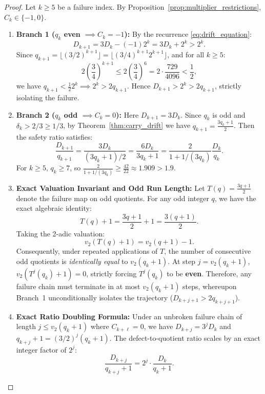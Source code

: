\documentclass[11pt,reqno]{amsart}
\theoremstyle{definition}
\numberwithin{equation}{section}
\begin{document}
\begin{proof}
Let $k \ge 5$ be a failure index. By Proposition~\ref{prop:multiplier_restrictions}, $C_k \in \{-1, 0\}$.
\begin{enumerate}
    \item \textbf{Branch 1 ($q_k$ even $\implies C_k = -1$):}
    By the recurrence \eqref{eq:drift_equation}:
    \[
    D_{k+1} = 3 D_k - (-1) 2^k = 3 D_k + 2^k > 2^k.
    \]
    Since $q_{k+1} = \lfloor (3/2)^{k+1} \rfloor = \lfloor (3/4)^{k+1} 2^{k+1} \rfloor$, and for all $k \ge 5$:
    \[
    2 \left(\frac{3}{4}\right)^{k+1} \le 2 \left(\frac{3}{4}\right)^6 = 2 \cdot \frac{729}{4096} < \frac{1}{2},
    \]
    we have $q_{k+1} < \frac{1}{2} 2^k \implies 2^k > 2 q_{k+1}$.
    Hence $D_{k+1} > 2^k > 2 q_{k+1}$, strictly isolating the failure.
    \item \textbf{Branch 2 ($q_k$ odd $\implies C_k = 0$):}
    Here $D_{k+1} = 3 D_k$. Since $q_k$ is odd and $\delta_k > 2/3 \ge 1/3$, by Theorem~\ref{thm:carry_drift} we have $q_{k+1} = \frac{3 q_k + 1}{2}$.
    Then the safety ratio satisfies:
    \[
    \frac{D_{k+1}}{q_{k+1}} = \frac{3 D_k}{(3 q_k + 1)/2} = \frac{6 D_k}{3 q_k + 1} = \frac{2}{1 + 1/(3q_k)} \frac{D_k}{q_k}.
    \]
    For $k \ge 5$, $q_k \ge 7$, so $\frac{2}{1 + 1/(3q_k)} \ge \frac{42}{22} \approx 1.909 > 1.9$.
    \item \textbf{Exact Valuation Invariant and Odd Run Length:}
    Let $T(q) = \frac{3q+1}{2}$ denote the failure map on odd quotients. For any odd integer $q$, we have the exact algebraic identity:
    \begin{equation}\label{eq:collatz_invariant}
    T(q) + 1 = \frac{3q+1}{2} + 1 = \frac{3(q+1)}{2}.
    \end{equation}
    Taking the 2-adic valuation:
    \begin{equation}\label{eq:v2_collatz_drop}
    v_2(T(q) + 1) = v_2(q + 1) - 1.
    \end{equation}
    Consequently, under repeated applications of $T$, the number of consecutive odd quotients is \emph{identically equal} to $v_2(q_k + 1)$. At step $j = v_2(q_k + 1)$, $v_2(T^j(q_k) + 1) = 0$, strictly forcing $T^j(q_k)$ to be \textbf{even}. Therefore, any failure chain must terminate in at most $v_2(q_k + 1)$ steps, whereupon Branch~1 unconditionally isolates the trajectory ($D_{k+j+1} > 2 q_{k+j+1}$).
    \item \textbf{Exact Ratio Doubling Formula:}
    Under an unbroken failure chain of length $j \le v_2(q_k + 1)$ where $C_{k+\ell} = 0$, we have $D_{k+j} = 3^j D_k$ and $q_{k+j} + 1 = (3/2)^j (q_k + 1)$. The defect-to-quotient ratio scales by an exact integer factor of $2^j$:
    \begin{equation}\label{eq:exact_ratio_doubling}
    \frac{D_{k+j}}{q_{k+j} + 1} = 2^j \cdot \frac{D_k}{q_k + 1}.
    \end{equation}
\end{enumerate}
\end{proof}
\end{document}
